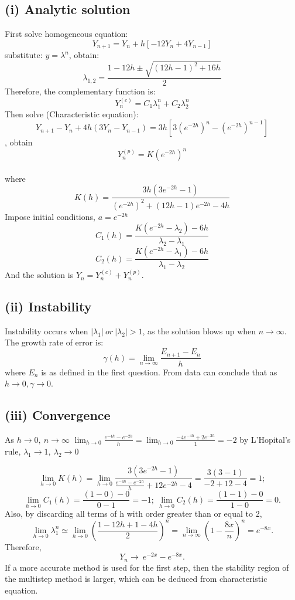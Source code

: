 \documentclass[11pt]{article}
\begin{document}
\subsection*{(i) Analytic solution}
First solve homogeneous equation:
$$Y_{n+1} = Y_{n} + h[-12Y_{n}+4Y_{n-1}]$$
substitute:
$y = \lambda^{n}$,
obtain:\\
$${\lambda}_{1,2} = \frac{1-12h \pm \sqrt{(12h-1)^{2}+16h}}{2}$$
Therefore, the complementary function is:
$$Y_{n}^{(c)} = C_{1} {\lambda}_{1}^{n}+C_{2} {\lambda}_{2}^{n}$$
Then solve (Characteristic equation): \\
$$Y_{n+1} -Y_{n} +4h(3Y_{n} - Y_{n-1})=3h[3(e^{-2h})^{n}-(e^{-2h})^{n-1}]$$
, obtain 
$$Y_{n}^{(p)}=K(e^{-2h})^{n}$$\\
where $$ K(h)=\frac{3h(3e^{-2h}-1)}{(e^{-2h})^{2}+(12h-1)e^{-2h}-4h}
$$
Impose initial conditions, $a=e^{-2h}$
$$C_{1}(h) = \frac{K(e^{-2h}-\lambda_{2})-6h}{\lambda_{2}-\lambda_{1}}$$
$$C_{2}(h) = \frac{K(e^{-2h}-\lambda_{1})-6h}{\lambda_{1}-\lambda_{2}}$$
And the solution is $Y_{n} = Y_{n}^{(c)}+Y_{n}^{(p)}$.
\subsection*{(ii) Instability}
Instability occurs when $\mathopen|\lambda_{1}\mathclose|\ or\ \mathopen|\lambda_{2}\mathclose| > 1$, as the solution blows up when $n \to \infty$.
The growth rate of error is:
$$\gamma(h) = \lim_{n\to \infty}\frac{E_{n+1}-E_{n}}{h}$$
where $E_{n}$ is as defined in the first question.
From data can conclude that as $ h\to 0 , \gamma\to 0.$
\subsection*{(iii) Convergence}
As $h\to 0,\ n\to\infty$
$\lim_{h \to 0}\frac{e^{-4h}-e^{-2h}}{h}=\lim_{h \to 0}\frac{-4e^{-4h}+2e^{-2h}}{1}=-2$ by L'Hopital's rule, $\lambda_{1} \to 1,\ \lambda_{2} \to 0$

$$\lim_{h\to 0}K(h) = \lim_{h\to 0}\frac{3(3e^{-2h}-1)}{\frac{e^{-4h}-e^{-2h}}{h}+12e^{-2h}-4}=\frac{3(3-1)}{-2+12-4}=1;$$
$$\lim_{h \to 0}C_{1}(h)  = \frac{(1-0)-0}{0-1} = -1;\ 
\lim_{h \to 0}C_{2}(h) = \frac{(1-1)-0}{1-0} = 0.
$$
Also, by discarding all terms of h with order greater than or equal to 2,
$$ \lim_{h \to 0} \lambda_{1}^{n} \simeq\lim_{h \to 0}\left(\frac{1-12h+1-4h}{2}\right)^{n}=\lim_{n \to \infty}\left(1-\frac{8x}{n}\right)^{n}= e^{-8x}.
$$
Therefore, $$Y_{n} \to \ e^{-2x}-e^{-8x}.$$
If a more accurate method is used for the first step, then the stability region of the multistep method is larger, which can be deduced from characteristic equation.
\pagebreak
\end{document}
